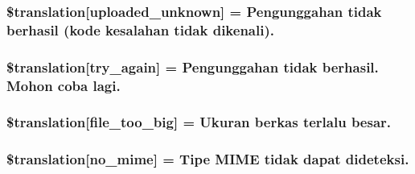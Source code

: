 \subsubsection[{\$translation}]{\setlength{\rightskip}{0pt plus 5cm}\$translation\mbox{[}\textquotesingle{}uploaded\+\_\+unknown\textquotesingle{}\mbox{]} = \textquotesingle{}Pengunggahan tidak berhasil (kode kesalahan tidak dikenali).\textquotesingle{}}\label{class_8upload_8id___i_d_8php_a4a9168e922b827e6a28b5db1c00774ca}
\hypertarget{class_8upload_8id___i_d_8php_a3afc377bd803683314f413a814243066}{}
\subsubsection[{\$translation}]{\setlength{\rightskip}{0pt plus 5cm}\$translation\mbox{[}\textquotesingle{}try\+\_\+again\textquotesingle{}\mbox{]} = \textquotesingle{}Pengunggahan tidak berhasil. Mohon coba lagi.\textquotesingle{}}\label{class_8upload_8id___i_d_8php_a3afc377bd803683314f413a814243066}
\hypertarget{class_8upload_8id___i_d_8php_a476278eb4a0c3df56af068e2d511a741}{}
\subsubsection[{\$translation}]{\setlength{\rightskip}{0pt plus 5cm}\$translation\mbox{[}\textquotesingle{}file\+\_\+too\+\_\+big\textquotesingle{}\mbox{]} = \textquotesingle{}Ukuran berkas terlalu besar.\textquotesingle{}}\label{class_8upload_8id___i_d_8php_a476278eb4a0c3df56af068e2d511a741}
\hypertarget{class_8upload_8id___i_d_8php_a191a55df8e3bb7f3c51b70f3c1932e02}{}
\subsubsection[{\$translation}]{\setlength{\rightskip}{0pt plus 5cm}\$translation\mbox{[}\textquotesingle{}no\+\_\+mime\textquotesingle{}\mbox{]} = \textquotesingle{}Tipe M\+I\+M\+E tidak dapat dideteksi.\textquotesingle{}}\label{class_8upload_8id___i_d_8php_a191a55df8e3bb7f3c51b70f3c1932e02}
\hypertarget{class_8upload_8id___i_d_8php_a4d32343e2699edd6fd435f9c832cb9c7}{}
